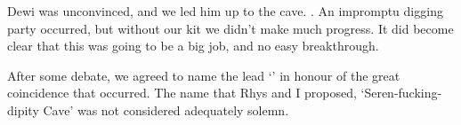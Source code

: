    Dewi was unconvinced, and we led him up to the cave. . An impromptu digging party occurred, but without our kit we didn't make much progress. It did become clear that this was going to be a big job, and no easy breakthrough. 
    
    After some debate, we agreed to name the lead `' in honour of the great coincidence that occurred. The name that Rhys and I proposed, `Seren-fucking-dipity Cave' was not considered adequately solemn.

    \begin{figure}[t!]
        \checkoddpage \ifoddpage \forcerectofloat \else \forceversofloat \fi
        \centering


\end{figure}
